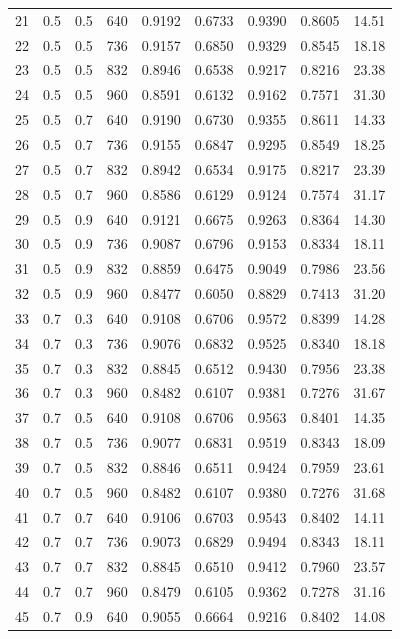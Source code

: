 \begin{table}[h]
{\begin{tabular}{|c|c|c|c|c|c|c|c|c|}
21 & 0.5 & 0.5 & 640 & 0.9192 & 0.6733 & 0.9390 & 0.8605 & 14.51 \\
22 & 0.5 & 0.5 & 736 & 0.9157 & 0.6850 & 0.9329 & 0.8545 & 18.18 \\
23 & 0.5 & 0.5 & 832 & 0.8946 & 0.6538 & 0.9217 & 0.8216 & 23.38 \\
24 & 0.5 & 0.5 & 960 & 0.8591 & 0.6132 & 0.9162 & 0.7571 & 31.30 \\
25 & 0.5 & 0.7 & 640 & 0.9190 & 0.6730 & 0.9355 & 0.8611 & 14.33 \\
26 & 0.5 & 0.7 & 736 & 0.9155 & 0.6847 & 0.9295 & 0.8549 & 18.25 \\
27 & 0.5 & 0.7 & 832 & 0.8942 & 0.6534 & 0.9175 & 0.8217 & 23.39 \\
28 & 0.5 & 0.7 & 960 & 0.8586 & 0.6129 & 0.9124 & 0.7574 & 31.17 \\
29 & 0.5 & 0.9 & 640 & 0.9121 & 0.6675 & 0.9263 & 0.8364 & 14.30 \\
30 & 0.5 & 0.9 & 736 & 0.9087 & 0.6796 & 0.9153 & 0.8334 & 18.11 \\
31 & 0.5 & 0.9 & 832 & 0.8859 & 0.6475 & 0.9049 & 0.7986 & 23.56 \\
32 & 0.5 & 0.9 & 960 & 0.8477 & 0.6050 & 0.8829 & 0.7413 & 31.20 \\
33 & 0.7 & 0.3 & 640 & 0.9108 & 0.6706 & 0.9572 & 0.8399 & 14.28 \\
34 & 0.7 & 0.3 & 736 & 0.9076 & 0.6832 & 0.9525 & 0.8340 & 18.18 \\
35 & 0.7 & 0.3 & 832 & 0.8845 & 0.6512 & 0.9430 & 0.7956 & 23.38 \\
36 & 0.7 & 0.3 & 960 & 0.8482 & 0.6107 & 0.9381 & 0.7276 & 31.67 \\
37 & 0.7 & 0.5 & 640 & 0.9108 & 0.6706 & 0.9563 & 0.8401 & 14.35 \\
38 & 0.7 & 0.5 & 736 & 0.9077 & 0.6831 & 0.9519 & 0.8343 & 18.09 \\
39 & 0.7 & 0.5 & 832 & 0.8846 & 0.6511 & 0.9424 & 0.7959 & 23.61 \\
40 & 0.7 & 0.5 & 960 & 0.8482 & 0.6107 & 0.9380 & 0.7276 & 31.68 \\
41 & 0.7 & 0.7 & 640 & 0.9106 & 0.6703 & 0.9543 & 0.8402 & 14.11 \\
42 & 0.7 & 0.7 & 736 & 0.9073 & 0.6829 & 0.9494 & 0.8343 & 18.11 \\
43 & 0.7 & 0.7 & 832 & 0.8845 & 0.6510 & 0.9412 & 0.7960 & 23.57 \\
44 & 0.7 & 0.7 & 960 & 0.8479 & 0.6105 & 0.9362 & 0.7278 & 31.16 \\
45 & 0.7 & 0.9 & 640 & 0.9055 & 0.6664 & 0.9216 & 0.8402 & 14.08 \\

\end{tabular}}
\end{table}
